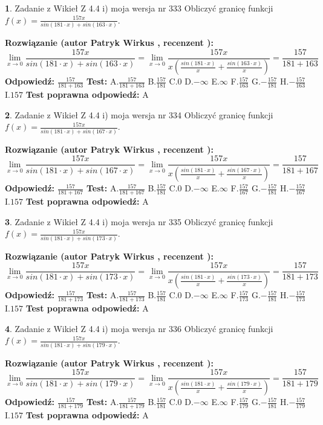 \documentclass[12pt, a4paper]{article}
\theoremstyle{definition} %
\newtheorem{zad}{}
\newcommand{\zadStart}[1]{\begin{zad}#1\newline}
\newcommand{\zadStop}{\end{zad}}
\newcommand{\rozwStart}[2]{\noindent \textbf{Rozwiązanie (autor #1 , recenzent #2): }\newline}
\newcommand{\rozwStop}{\newline}
\newcommand{\odpStart}{\noindent \textbf{Odpowiedź:}\newline}
\newcommand{\odpStop}{\newline}
\newcommand{\testStart}{\noindent \textbf{Test:}\newline}
\newcommand{\testStop}{\newline}
\newcommand{\kluczStart}{\noindent \textbf{Test poprawna odpowiedź:}\newline}
\newcommand{\kluczStop}{\newline}
\begin{document}
\zadStart{Zadanie z Wikieł Z 4.4 i) moja wersja nr 333}
Obliczyć granicę funkcji $f(x)=\frac{157x}{sin(181\cdot x) +sin(163\cdot x)}$.
\zadStop
\rozwStart{Patryk Wirkus}{}
$$\lim\limits_{x\to 0}\frac{157x}{sin(181\cdot x) +sin(163\cdot x)}=\lim\limits_{x\to 0}\frac{157x}{x(\frac{sin(181\cdot x)}{x}+\frac{sin(163\cdot x)}{x})}=\frac{157}{181+163}$$
\rozwStop
\odpStart
$\frac{157}{181+163}$
\odpStop
\testStart
A.$\frac{157}{181+163}$
B.$\frac{157}{181}$
C.$0$
D.$-\infty$
E.$\infty$
F.$\frac{157}{163}$
G.$-\frac{157}{181}$
H.$-\frac{157}{163}$
I.$157$
\testStop
\kluczStart
A
\kluczStop



\zadStart{Zadanie z Wikieł Z 4.4 i) moja wersja nr 334}
Obliczyć granicę funkcji $f(x)=\frac{157x}{sin(181\cdot x) +sin(167\cdot x)}$.
\zadStop
\rozwStart{Patryk Wirkus}{}
$$\lim\limits_{x\to 0}\frac{157x}{sin(181\cdot x) +sin(167\cdot x)}=\lim\limits_{x\to 0}\frac{157x}{x(\frac{sin(181\cdot x)}{x}+\frac{sin(167\cdot x)}{x})}=\frac{157}{181+167}$$
\rozwStop
\odpStart
$\frac{157}{181+167}$
\odpStop
\testStart
A.$\frac{157}{181+167}$
B.$\frac{157}{181}$
C.$0$
D.$-\infty$
E.$\infty$
F.$\frac{157}{167}$
G.$-\frac{157}{181}$
H.$-\frac{157}{167}$
I.$157$
\testStop
\kluczStart
A
\kluczStop



\zadStart{Zadanie z Wikieł Z 4.4 i) moja wersja nr 335}
Obliczyć granicę funkcji $f(x)=\frac{157x}{sin(181\cdot x) +sin(173\cdot x)}$.
\zadStop
\rozwStart{Patryk Wirkus}{}
$$\lim\limits_{x\to 0}\frac{157x}{sin(181\cdot x) +sin(173\cdot x)}=\lim\limits_{x\to 0}\frac{157x}{x(\frac{sin(181\cdot x)}{x}+\frac{sin(173\cdot x)}{x})}=\frac{157}{181+173}$$
\rozwStop
\odpStart
$\frac{157}{181+173}$
\odpStop
\testStart
A.$\frac{157}{181+173}$
B.$\frac{157}{181}$
C.$0$
D.$-\infty$
E.$\infty$
F.$\frac{157}{173}$
G.$-\frac{157}{181}$
H.$-\frac{157}{173}$
I.$157$
\testStop
\kluczStart
A
\kluczStop



\zadStart{Zadanie z Wikieł Z 4.4 i) moja wersja nr 336}
Obliczyć granicę funkcji $f(x)=\frac{157x}{sin(181\cdot x) +sin(179\cdot x)}$.
\zadStop
\rozwStart{Patryk Wirkus}{}
$$\lim\limits_{x\to 0}\frac{157x}{sin(181\cdot x) +sin(179\cdot x)}=\lim\limits_{x\to 0}\frac{157x}{x(\frac{sin(181\cdot x)}{x}+\frac{sin(179\cdot x)}{x})}=\frac{157}{181+179}$$
\rozwStop
\odpStart
$\frac{157}{181+179}$
\odpStop
\testStart
A.$\frac{157}{181+179}$
B.$\frac{157}{181}$
C.$0$
D.$-\infty$
E.$\infty$
F.$\frac{157}{179}$
G.$-\frac{157}{181}$
H.$-\frac{157}{179}$
I.$157$
\testStop
\kluczStart
A
\kluczStop
\end{document}
